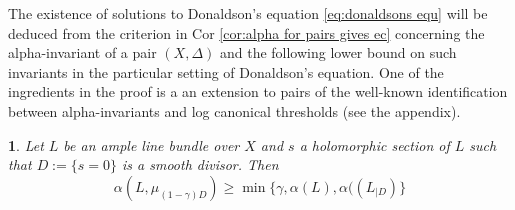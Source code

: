 \documentclass[11pt,oneside,english]{amsart}
\numberwithin{equation}{section}
\numberwithin{figure}{section}
\theoremstyle{plain}
\theoremstyle{plain}
\theoremstyle{plain}
\theoremstyle{plain}
\newtheorem{prop}[thm]{\protect\propositionname}
\theoremstyle{remark}
\theoremstyle{definition}
\providecommand{\propositionname}{Proposition}
\begin{document}
The existence of solutions to Donaldson's equation \ref{eq:donaldsons equ}
will be deduced from the criterion in Cor \ref{cor:alpha for pairs gives ec}
concerning the alpha-invariant of a pair $(X,\Delta)$ and the following
lower bound on such invariants in the particular setting of Donaldson's
equation. One of the ingredients in the proof is a an extension to
pairs of the well-known identification between alpha-invariants and
log canonical thresholds (see the appendix). 
\begin{prop}
\label{pro:Lower bound on alpha of pair}Let $L$ be an ample line
bundle over $X$ and $s$ a holomorphic section of $L$ such that
$D:=\{s=0\}$ is a smooth divisor. Then 
\begin{equation}
\alpha(L,\mu_{(1-\gamma)D})\geq\min\{\gamma,\alpha(L),\alpha((L_{|D})\}\label{eq:lower bound on alpha for pair in prop}
\end{equation}
\end{prop}
\end{document}
